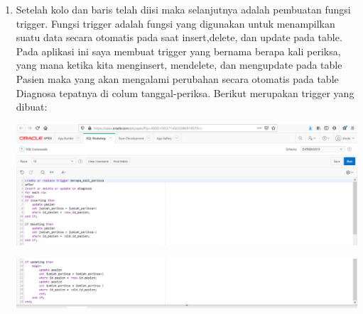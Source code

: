 \begin{enumerate}
    \item Setelah kolo dan baris telah diisi maka selanjutnya adalah pembuatan  fungsi trigger. Fungsi trigger adalah fungsi yang digunakan untuk menampilkan suatu data secara otomatis pada saat insert,delete, dan update pada table. Pada aplikasi ini saya membuat  trigger yang bernama berapa kali periksa, yang mana ketika kita menginsert, mendelete, dan mengupdate pada table Pasien maka yang akan mengalami perubahan secara otomatis pada table Diagnosa  tepatnya di colum tanggal-periksa. Berikut merupakan trigger yang dibuat:
     \begin{center}
    \includegraphics[width=10cm\textwidth]{gambar/14.png}
    \end{center}
    \begin{center}
    \includegraphics[width=10cm\textwidth]{gambar/15.png}
    \end{center}
    

\end{enumerate}
